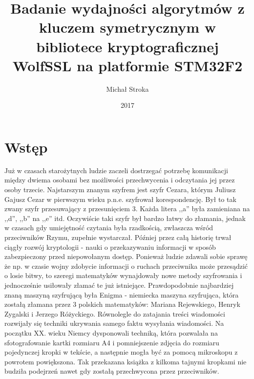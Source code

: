 \documentclass[oneside]{mgr}
\title{Badanie wydajności algorytmów z kluczem symetrycznym w bibliotece kryptograficznej WolfSSL na platformie STM32F2}
\author{Michał Stroka}
\date{2017} %
\begin{document}

\maketitle

\tableofcontents %

\chapter{Wstęp}
Już w czasach starożytnych ludzie zaczeli dostrzegać potrzebę komunikacji między dwiema osobami bez możliwości przechwycenia i odczytania jej przez osoby trzecie. Najstarszym znanym szyfrem jest szyfr Cezara, którym Juliusz Gajusz Cezar w pierwszym wieku p.n.e. szyfrował korespondencję. Był to tak zwany szyfr przesuwający z przesunięciem 3. Każda litera ,,a'' była zamieniana na ,,d'', ,,b'' na ,,e'' itd. Oczywiście taki szyfr był bardzo łatwy do złamania, jednak w czasach gdy umiejętność czytania była rzadkością, zwłaszcza wśród przeciwników Rzymu, zupełnie wystarczał. Później przez całą historię trwał ciągły rozwój kryptologii - nauki o przekazywaniu informacji w sposób zabezpieczony przed niepowołanym dostęp. Ponieważ ludzie zdawali sobie sprawę że np. w czasie wojny zdobycie informacji o ruchach przeciwnika może przesądzić o losie bitwy, to szeregi matematyków wynajdowały nowe metody szyfrowania i jednocześnie usiłowały złamać te już istniejące. Prawdopodobnie najbardziej znaną maszyną szyfrującą była Enigma - niemiecka maszyna szyfrująca, która zostałą złamana przez 3 polskich matematyków: Mariana Rejewskiego, Henryk Zygalski i Jerzego Różyckiego. Równolegle do zatajania treści wiadomości rozwijały się techniki ukrywania samego faktu wysyłania wiadomości. Na początku XX. wieku Niemcy dysponowali techniką, która pozwalała na sfotografowanie kartki rozmiaru A4 i pomniejszenie zdjęcia do rozmiaru pojedynczej kropki w tekście, a następnie mogła być za pomocą mikroskopu z powrotem powiększona. Tak przekazana książka z kilkoma tajnymi kropkami nie budziła podejrzeń nawet gdy zostałą przechwycona przez przeciwników.\\
\end{document}
